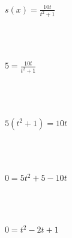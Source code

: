 \begin{eqnarray}s(x)=\frac{10t}{t^2+1}\\\\\\\\\\\\\\\\\\\\\\\\
5=\frac{10t}{t^2+1}\\\\\\\\\\\\\\\\\\\\\\\\
5\left(t^2+1\right)=10t\\\\\\\\\\\\\\\\\\\\\\\\
0=5t^2+5-10t\\\\\\\\\\\\\\\\\\\\\\\\
0=t^2-2t+1
\end{eqnarray}